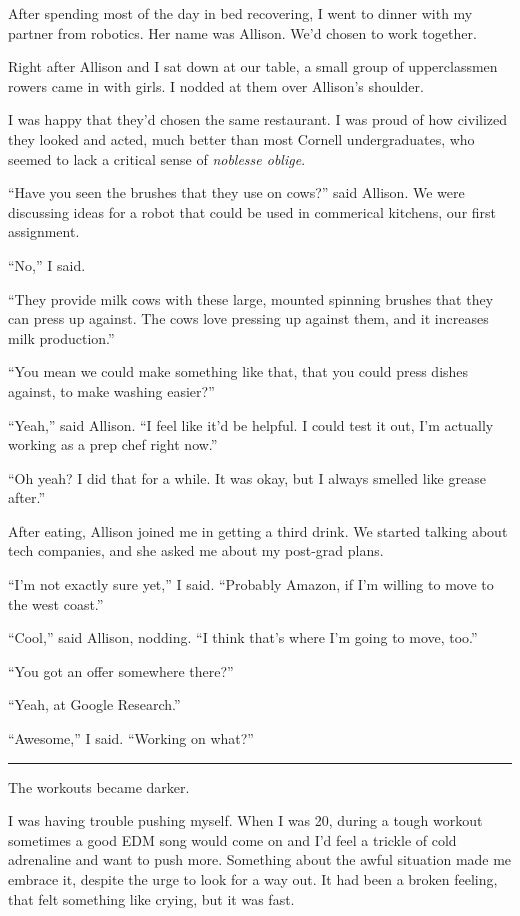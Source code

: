 After spending most of the day in bed recovering, I went to dinner with my
partner from robotics.  Her name was Allison.  We'd chosen to work together.  

Right after Allison and I sat down at our table, a small group of upperclassmen
rowers came in with girls.  I nodded at them over Allison's shoulder.  

I was happy that they'd chosen the same restaurant.  I was proud of how
civilized they looked and acted, much better than most Cornell undergraduates,
who seemed to lack a critical sense of \textit{noblesse oblige}.

``Have you seen the brushes that they use on cows?'' said Allison.  We were
discussing ideas for a robot that could be used in commerical kitchens, our
first assignment.

``No,'' I said.

``They provide milk cows with these large, mounted spinning brushes that they
can press up against.  The cows love pressing up against them, and it increases
milk production.'' 

``You mean we could make something like that, that you could press dishes
against, to make washing easier?''

``Yeah,'' said Allison.  ``I feel like it'd be helpful.  I could test it out,
I'm actually working as a prep chef right now.''

``Oh yeah?  I did that for a while.  It was okay, but I always smelled like
grease after.''

After eating, Allison joined me in getting a third drink.  We started talking
about tech companies, and she asked me about my post-grad plans.  

``I'm not exactly sure yet,'' I said.  ``Probably Amazon, if I'm willing to move
to the west coast.''

``Cool,'' said Allison, nodding.  ``I think that's where I'm going to move,
too.''

``You got an offer somewhere there?''

``Yeah, at Google Research.''

``Awesome,'' I said.  ``Working on what?''

\plainfancybreak{12pt}{2}{* * *}

The workouts became darker.  

I was having trouble pushing myself.  When I was 20, during a tough workout
sometimes a good EDM song would come on and I'd feel a trickle of cold
adrenaline and want to push more.  Something about the awful situation made me
embrace it, despite the urge to look for a way out.  It had been a broken
feeling, that felt something like crying, but it was fast.

